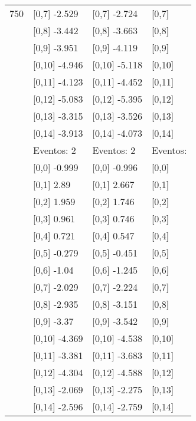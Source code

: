 \begin{table}
\begin{tabular}[t]{llll}
750 & {}[0,7] -2.529 & {}[0,7] -2.724 & {}[0,7]\\
\addlinespace
 & {}[0,8] -3.442 & {}[0,8] -3.663 & {}[0,8]\\
 & {}[0,9] -3.951 & {}[0,9] -4.119 & {}[0,9]\\
 & {}[0,10] -4.946 & {}[0,10] -5.118 & {}[0,10]\\
 & {}[0,11] -4.123 & {}[0,11] -4.452 & {}[0,11]\\
 & {}[0,12] -5.083 & {}[0,12] -5.395 & {}[0,12]\\
\addlinespace
 & {}[0,13] -3.315 & {}[0,13] -3.526 & {}[0,13]\\
 & {}[0,14] -3.913 & {}[0,14] -4.073 & {}[0,14]\\
 & Eventos:  2 & Eventos:  2 & Eventos:\\
 & {}[0,0] -0.999 & {}[0,0] -0.996 & {}[0,0]\\
 & {}[0,1] 2.89 & {}[0,1] 2.667 & {}[0,1]\\
\addlinespace
 & {}[0,2] 1.959 & {}[0,2] 1.746 & {}[0,2]\\
 & {}[0,3] 0.961 & {}[0,3] 0.746 & {}[0,3]\\
 & {}[0,4] 0.721 & {}[0,4] 0.547 & {}[0,4]\\
 & {}[0,5] -0.279 & {}[0,5] -0.451 & {}[0,5]\\
 & {}[0,6] -1.04 & {}[0,6] -1.245 & {}[0,6]\\
\addlinespace
1000 & {}[0,7] -2.029 & {}[0,7] -2.224 & {}[0,7]\\
 & {}[0,8] -2.935 & {}[0,8] -3.151 & {}[0,8]\\
 & {}[0,9] -3.37 & {}[0,9] -3.542 & {}[0,9]\\
 & {}[0,10] -4.369 & {}[0,10] -4.538 & {}[0,10]\\
 & {}[0,11] -3.381 & {}[0,11] -3.683 & {}[0,11]\\
\addlinespace
 & {}[0,12] -4.304 & {}[0,12] -4.588 & {}[0,12]\\
 & {}[0,13] -2.069 & {}[0,13] -2.275 & {}[0,13]\\
 & {}[0,14] -2.596 & {}[0,14] -2.759 & {}[0,14]\\
\bottomrule
\end{tabular}
\end{table}
